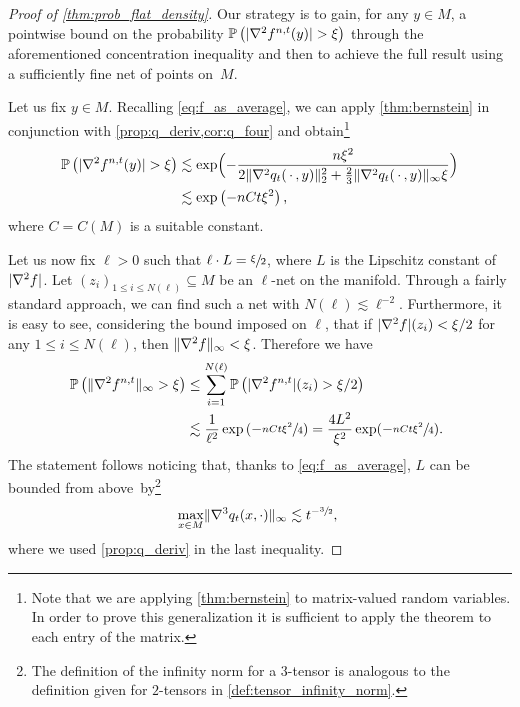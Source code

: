 \documentclass[10pt]{amsart}
\theoremstyle{plain}
\theoremstyle{definition}
\numberwithin{equation}{section}
\newcommand{\emptyparam}{\ensuremath{\,\cdot\,}}
\renewcommand{\P}[1]{\ensuremath{\operatorname{\mathbb{P}}\left(#1\right)}}
\renewcommand{\comma}{\ensuremath{\text{, }}}
\newcommand{\comma}{\ensuremath{\text{, }}}
\newcommand{\fullstop}{\ensuremath{\text{. }}}
\DeclarePairedDelimiter\abs{\lvert}{\rvert}
\DeclarePairedDelimiter\norm{\lVert}{\rVert}
\begin{document}
\begin{proof}[Proof of \cref{thm:prob_flat_density}]
Our strategy is to gain, for any $y\in M$, a pointwise bound on the probability
$\P{\abs{\nabla^2f^{n,t}(y)}>\xi}$ through the aforementioned concentration inequality and then to achieve
the full result using a sufficiently fine net of points on~$M$.

Let us fix $y\in M$. Recalling \cref{eq:f_as_average}, we can apply \cref{thm:bernstein}
in conjunction with \cref{prop:q_deriv,cor:q_four} and obtain\footnote{Note that we are applying \cref{thm:bernstein} to matrix-valued random variables. In order to prove this generalization it is sufficient to apply the theorem to each entry of the matrix.}
\begin{align*}
\P{\abs{\nabla^2 f^{n,t}(y)}>\xi}
&\lesssim \exp\Bigl(-\frac{n\xi^2}{
2\norm{\nabla^2 q_t(\emptyparam, y)}^2_2+\frac23\norm{\nabla^2 q_t(\emptyparam, y)}_\infty\xi
}\Bigr) \\
&\lesssim \exp\left(-nCt\xi^2\right)\comma
\end{align*}
where $C=C(M)$ is a suitable constant.

Let us now fix $\ell>0$ such that
$\ell\cdot L=\sfrac\xi2$, where $L$ is the Lipschitz constant of $\abs{\nabla^2 f}$.
Let $(z_i)_{1\le i\le N(\ell)}\subseteq M$ be
an $\ell$-net on the manifold.
Through a fairly standard approach, we can find such a net with $N(\ell)\lesssim \ell^{-2}$.
Furthermore, it is easy to see, considering the bound imposed on $\ell$, that if
$\abs{\nabla^2 f}(z_i)<\xi/2$ for any $1\le i\le N(\ell)$, then $\norm{\nabla^2 f}_\infty<\xi$.
Therefore we have
\begin{align*}
\P{\norm{\nabla^2 f^{n,t}}_\infty>\xi}
&\le \sum_{i=1}^{N(\ell)}\P{\abs{\nabla^2 f^{n,t}}(z_i)>\xi/2}\\
&\lesssim \frac1{\ell^2} \exp\left(-\sfrac{nCt\xi^2}4\right)
= \frac{4L^2}{\xi^2}\exp(-\sfrac{nCt\xi^2}{4})\fullstop
\end{align*}
The statement follows noticing that, thanks to \cref{eq:f_as_average}, $L$ can be bounded
from above~by\footnote{The definition of the infinity norm for a $3$-tensor
is analogous to the definition given for $2$\nobreakdash-tensors in \cref{def:tensor_infinity_norm}.}
\begin{equation*}
\max_{x\in M}\norm{\nabla^3 q_t(x,\cdot)}_\infty\lesssim t^{-\sfrac32} \comma
\end{equation*}
where we used \cref{prop:q_deriv} in the last inequality.
\end{proof}
\end{document}
